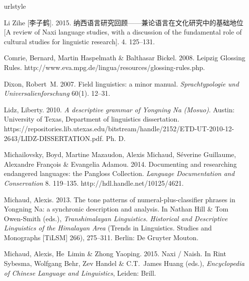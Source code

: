 \documentclass[oldfontcommands,oneside,a4paper,11pt]{article}
\newcommand{\zh}[1]{{\cn #1}}
\begin{document}
	\begin{thebibliography}{7}
		\providecommand{\natexlab}[1]{#1}
		\providecommand{\url}[1]{#1}
		\providecommand{\urlprefix}{}
		\expandafter\ifx\csname urlstyle\endcsname\relax
		\providecommand{\doi}[1]{doi:\discretionary{}{}{}#1}\else
		\providecommand{\doi}{doi:\discretionary{}{}{}\begingroup
			\urlstyle{rm}\Url}\fi
		
		Li Zihe [\zh{李子鹤}]. 2015.
		\newblock
		\zh{纳西语言研究回顾------兼论语言在文化研究中的基础地位}
		[{A} review of {Naxi} language studies, with a discussion of the fundamental
		role of cultural studies for linguistic research].
		\newblock \zh{茶马古道研究期刊} 4. 125--131.
		
		Comrie, Bernard, Martin Haspelmath \& Balthasar Bickel. 2008.
		\newblock Leipzig {Glossing Rules}.
		\newblock
		\urlprefix\url{http://www.eva.mpg.de/lingua/resources/glossing-rules.php}.
		
		Dixon, Robert~M. 2007.
		\newblock Field linguistics: a minor manual.
		\newblock \emph{Sprachtypologie und Universalienforschung} 60(1). 12--31.
		
		Lidz, Liberty. 2010.
		\newblock \emph{A descriptive grammar of {Yongning Na} ({Mosuo})}.
		\newblock Austin: University of Texas, Department of linguistics dissertation.
		\newblock
		\urlprefix\url{https://repositories.lib.utexas.edu/bitstream/handle/2152/ETD-UT-2010-12-2643/LIDZ-DISSERTATION.pdf}.
		\newblock Ph. D.
		
		Michailovsky, Boyd, Martine Mazaudon, Alexis Michaud, S{\'{e}}verine Guillaume,
		Alexandre Fran{\c{c}}ois \& Evangelia Adamou. 2014.
		\newblock Documenting and researching endangered languages: the {Pangloss
			Collection}.
		\newblock \emph{Language Documentation and Conservation} 8. 119--135.
		\newblock \urlprefix\url{http://hdl.handle.net/10125/4621}.
		
		Michaud, Alexis. 2013.
		\newblock The tone patterns of numeral-plus-classifier phrases in {Yongning
			Na}: a synchronic description and analysis.
		\newblock In Nathan Hill \& Tom Owen-Smith (eds.), \emph{Transhimalayan
			{Linguistics}. {Historical} and {Descriptive} {Linguistics} of the
			{Himalayan} {Area}} (Trends in {Linguistics}. {Studies} and {Monographs}
		[{TiLSM}] 266), 275--311. Berlin: De Gruyter Mouton.
		
		Michaud, Alexis, He~Limin \& Zhong Yaoping. 2015.
		\newblock Naxi / {Naish}.
		\newblock In Rint Sybesma, Wolfgang Behr, Zev Handel \& C.T.~James Huang
		(eds.), \emph{Encyclopedia of {Chinese} {Language} and {Linguistics}},
		Leiden: Brill.
		
	\end{thebibliography}
	
\end{document}
